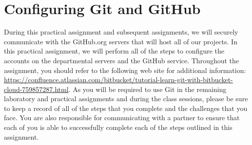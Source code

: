 \section*{Configuring Git and GitHub}

During this practical assignment and subsequent assignments, we will securely communicate with the GitHub.org servers
that will host all of our projects.  In this practical assignment, we will perform all of the steps to configure the
accounts on the departmental servers and the GitHub service.  Throughout the assignment, you should refer to the
following web site for additional information: \url{https://confluence.atlassian.com/bitbucket/tutorial-learn-git-with-bitbucket-cloud-759857287.html}.
As you will be required to use Git in the remaining laboratory and practical assignments and during the class sessions,
please be sure to keep a record of all of the steps that you complete and the challenges that you face.  You are also
responsible for communicating with a partner to ensure that each of you is able to successfully complete each of the
steps outlined in this assignment.

